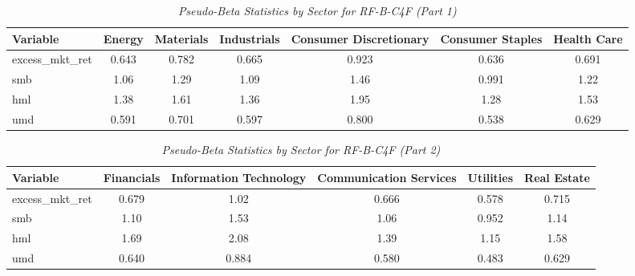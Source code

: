         \begin{table}[ht]
        \centering
        \caption{\textit{Pseudo-Beta Statistics by Sector for RF-B-C4F (Part 1)}}
        \label{tab:rfi_statistics_1}
        \begin{tabular}{lcccccc}
        \toprule
        \textbf{Variable} & \textbf{Energy} & \textbf{Materials} & \textbf{Industrials} & \textbf{Consumer Discretionary} & \textbf{Consumer Staples} & \textbf{Health Care} \\
        \midrule
        excess\_mkt\_ret & 0.643 & 0.782 & 0.665 & 0.923 & 0.636 & 0.691 \\
smb & 1.06 & 1.29 & 1.09 & 1.46 & 0.991 & 1.22 \\
hml & 1.38 & 1.61 & 1.36 & 1.95 & 1.28 & 1.53 \\
umd & 0.591 & 0.701 & 0.597 & 0.800 & 0.538 & 0.629 \\
        \bottomrule
        \end{tabular}%
        \end{table}

        \begin{table}[ht]
        \centering
        \caption{\textit{Pseudo-Beta Statistics by Sector for RF-B-C4F (Part 2)}}
        \label{tab:rfi_statistics_2}
        \begin{tabular}{lccccc}
        \toprule
        \textbf{Variable} & \textbf{Financials} & \textbf{Information Technology} & \textbf{Communication Services} & \textbf{Utilities} & \textbf{Real Estate} \\
        \midrule
        excess\_mkt\_ret & 0.679 & 1.02 & 0.666 & 0.578 & 0.715 \\
smb & 1.10 & 1.53 & 1.06 & 0.952 & 1.14 \\
hml & 1.69 & 2.08 & 1.39 & 1.15 & 1.58 \\
umd & 0.640 & 0.884 & 0.580 & 0.483 & 0.629 \\
        \bottomrule
        \end{tabular}%
        \end{table}